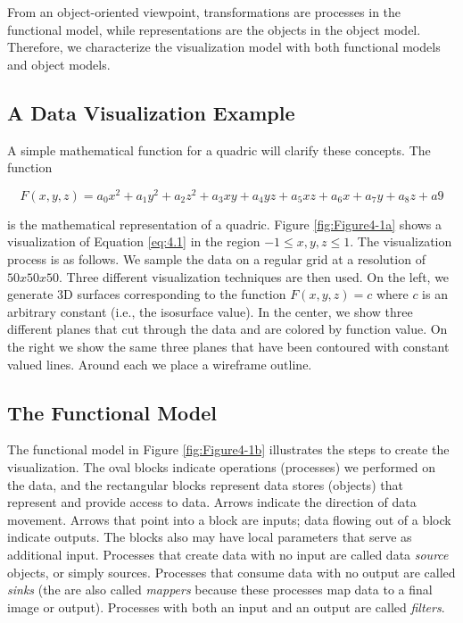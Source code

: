 From an object-oriented viewpoint, transformations are processes in the functional model, while representations are the objects in the object model. Therefore, we characterize the visualization model with both functional models and object models.

\subsection{A Data Visualization Example}

A simple mathematical function for a quadric will clarify these
concepts. The function

\begin{equation}\label{eq:4.1}
F(x,y,z) = a_0x^2 + a_1y^2 + a_2z^2 + a_3xy + a_4yz + a_5xz + a_6x + a_7y + a_8z + a9
\end{equation}

is the mathematical representation of a quadric. Figure \ref{fig:Figure4-1a} shows a visualization of Equation \ref{eq:4.1} in the region $-1 \leqslant x, y, z \leqslant 1$. The visualization process is as follows. We sample the data on a regular grid at a resolution of $50 x 50 x 50$. Three
different visualization techniques are then used.
On the left, we generate 3D surfaces corresponding to the function $F(x,y,z) = c$ where $c$ is an arbitrary constant (i.e., the isosurface
value).
In the center, we show three different planes that cut through the data and are colored by function value.
On the right we show the same three planes that have been contoured with constant valued lines.
Around each we place a wireframe outline.

\subsection{The Functional Model}

The functional model in Figure \ref{fig:Figure4-1b} illustrates the steps to create the visualization.
The oval blocks indicate operations (processes) we performed on the data, and the rectangular blocks represent data stores (objects) that represent and provide access to data.
Arrows indicate the direction of data movement.
Arrows that point into a block are inputs; data flowing out of a block indicate outputs.
The blocks also may have local parameters that serve as additional input.
Processes that create data with no input are called data \emph{source} objects, or simply sources. Processes that consume data with no output are called \emph{sinks} (the are also called \emph{mappers} because these processes map data to a final image or output).
Processes with both an input and an output are called \emph{filters}.

